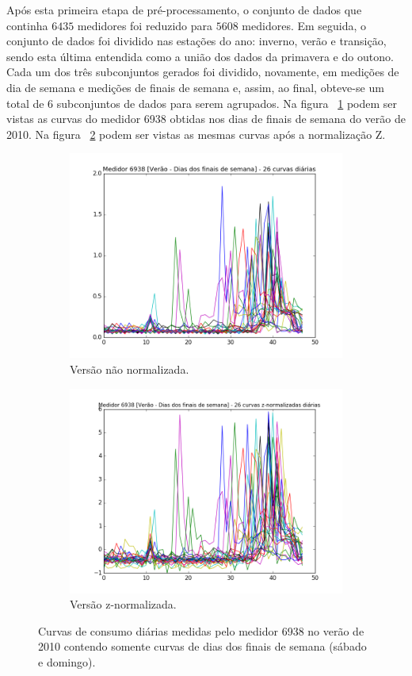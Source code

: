 Após esta primeira etapa de pré-processamento, o conjunto de dados que continha $6435$ medidores foi reduzido para $5608$ medidores. Em seguida, o conjunto de dados foi dividido nas estações do ano: inverno, verão e transição, sendo esta última entendida como a união dos dados da primavera e do outono. Cada um dos três subconjuntos gerados foi dividido, novamente, em medições de dia de semana e medições de finais de semana e, assim, ao final, obteve-se um total de $6$ subconjuntos de dados para serem agrupados. Na figura ~\ref{fig:6938_raw} podem ser vistas as curvas do medidor 6938 obtidas nos dias de finais de semana do verão de 2010. Na figura ~\ref{fig:6938_Z} podem ser vistas as mesmas curvas após a normalização Z.

\begin{figure}
	\centering
	\begin{subfigure}{.5\textwidth}
		\centering
		\includegraphics[width=.9\linewidth]{figuras/irish/raw_data_6938.png}
		\caption{Versão não normalizada.}
		\label{fig:6938_raw}
	\end{subfigure}%
	\begin{subfigure}{.5\textwidth}
		\centering
		\includegraphics[width=.9\linewidth]{figuras/irish/Z_norm_6938.png}
		\caption{Versão z-normalizada.}
		\label{fig:6938_Z}
	\end{subfigure}
	\caption{Curvas de consumo diárias medidas pelo medidor 6938 no verão de 2010 contendo somente curvas de dias dos finais de semana (sábado e domingo).}
	\label{fig:Z_norm}
\end{figure}

